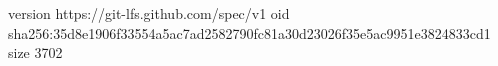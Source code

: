 version https://git-lfs.github.com/spec/v1
oid sha256:35d8e1906f33554a5ac7ad2582790fc81a30d23026f35e5ac9951e3824833cd1
size 3702
